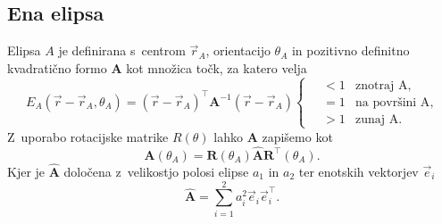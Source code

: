 \subsection{Ena elipsa}
Elipsa $A$ je definirana s~centrom $\vec{r}_A$, orientacijo $\theta_A$ in pozitivno 
definitno kvadratično formo $\mathbf{A}$ kot množica točk, za katero velja
\begin{equation}
    E_A (\vec{r}-\vec{r}_A, \theta_A) = 
    (\vec{r} - \vec{r}_A)^{\top} \mathbf{A}^{-1} (\vec{r} - \vec{r}_A)
    \begin{cases}
        \quad <1 & \text{znotraj A},\\
        \quad =1 & \text{na površini A},\\
        \quad >1 & \text{zunaj A}.
    \end{cases}
    \label{eq:elipsa}
\end{equation}
Z~uporabo rotacijske matrike $R(\theta)$ lahko $\mathbf{A}$ zapišemo kot
\begin{equation}
    \mathbf{A} (\theta_A) = \mathbf{R}(\theta_A) \hat{\mathbf{A}} 
                            \mathbf{R}^{\top}(\theta_A).
\end{equation}
Kjer je $\hat{\mathbf{A}}$ določena z~velikostjo polosi elipse $a_1$ in $a_2$ 
ter enotskih vektorjev $\vec{e}_i$ 
\begin{equation}
    \hat{\mathbf{A}} = \sum_{i=1}^{2} a_i^2 \vec{e}_i \vec{e}_i^{\top}.
\end{equation}


